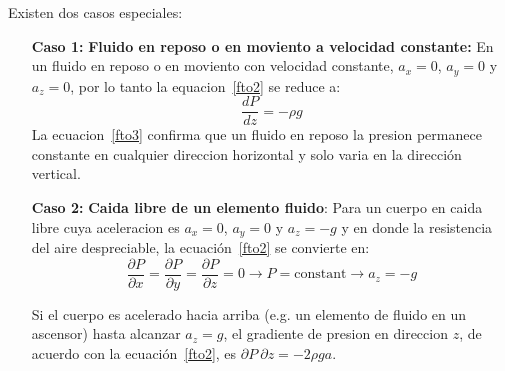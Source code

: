 \documentclass[10pt, oneside]{article}
\begin{document}
Existen dos casos especiales:
\begin{enumerate}
\item[\textbf{Caso 1:}] \textbf{Fluido en reposo o en moviento a velocidad constante:}
En un fluido en reposo o en moviento con velocidad constante, $a_x=0$, $a_y=0$ y $a_z=0$, por lo tanto la equacion~\ref{fto2} se reduce a:
\begin{equation}
\frac{d P}{d z} = -\rho g
\label{fto3}
\end{equation}
La ecuacion~\ref{fto3} confirma que un fluido en reposo la presion permanece constante en cualquier direccion horizontal y solo varia en la direcci\'on vertical.

\item[\textbf{Caso 2:}] \textbf{Caida libre de un elemento fluido}: Para un cuerpo en caida libre cuya aceleracion es $a_x =0$, $a_y =0$ y $a_z = -g$ y en donde la resistencia del aire despreciable, la ecuaci\'on~\ref{fto2} se convierte en:
\begin{equation}
\frac{\partial P}{\partial x} =\frac{\partial P}{\partial y} =\frac{\partial P}{\partial z} = 0 \rightarrow P=\text{constant} \rightarrow a_z=-g
\label{fto4}
\end{equation}

Si el cuerpo es acelerado hacia arriba (e.g. un elemento de fluido en un ascensor) hasta alcanzar $a_z = g$, el gradiente de presion en direccion $z$, de acuerdo con la ecuaci\'on~\ref{fto2}, es $\partial P \ \partial z = -2\rho ga$.

\end{enumerate}
\end{document}
